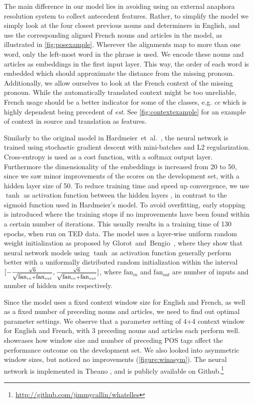 \documentclass[11pt]{article}
\begin{document}
The main difference in our model lies in avoiding using an external anaphora resolution system to collect antecedent features.
Rather, to simplify the model we simply look at the four closest previous nouns and determiners in English, and use the corresponding aligned French nouns and articles in the model, as illustrated in \cref{fig:posexample}.
Wherever the alignments map to more than one word, only the left-most word in the phrase is used.
We encode these nouns and articles as embeddings in the first input layer. This way, the order of each word is embedded which should approximate the distance from the missing pronoun.
Additionally, we allow ourselves to look at the French context of the missing pronoun.
While the automatically translated context might be too unreliable, French usage should be a better indicator for some of the classes, e.g. \emph{ce} which is highly dependent being precedent of \emph{est}.
See \cref{fig:contextexample} for an example of context in source and translation as features.

Similarly to the original model in Hardmeier~et~al.~, the neural network is trained using stochastic gradient descent with mini-batches and L2 regularization.
Cross-entropy is used as a cost function, with a softmax output layer.
Furthermore the dimensionality of the embeddings is increased from 20 to 50, since we saw minor improvements of the scores on the development set, with a hidden layer size of 50.
To reduce training time and speed up convergence, we use $\tanh$ as activation function between the hidden layers \cite{Lecun2012Efficient}, in contrast to the sigmoid function used in Hardmeier's model.
To avoid overfitting, early stopping is introduced where the training stops if no improvements have been found within a certain number of iterations.
This usually results in a training time of 130 epochs, when run on TED data.
The model uses a layer-wise uniform random weight initialization as proposed by Glorot~and~Bengio~, where they show that neural network models using $\tanh$ as activation function generally perform better with a uniformally distributed random initialization within the interval $[-\frac{\sqrt{6}}{\sqrt{\mbox{\small fan}_{in}+\mbox{\small fan}_{out}}},\frac{\sqrt{6}}{\sqrt{\mbox{\small fan}_{in}+\mbox{\small fan}_{out}}}]$, where $\mbox{fan}_{in}$ and $\mbox{fan}_{out}$ are number of inputs and number of hidden units respectively.

Since the model uses a fixed context window size for English and French, as well as a fixed number of preceding nouns and articles, we need to find out optimal parameter settings. We observe that a parameter setting of 4+4 context window for English and French, with 3 preceding nouns and articles each perform well.  showcases how window size and number of preceding POS tags affect the performance outcome on the development set. We also looked into asymmetric window sizes, but noticed no improvements (\cref{figure:winasym}).
The neural network is implemented in Theano \cite{Bergstra2010Theano}, and is publicly available on Github.\footnote{\url{http://github.com/jimmycallin/whatelles}}
\end{document}
